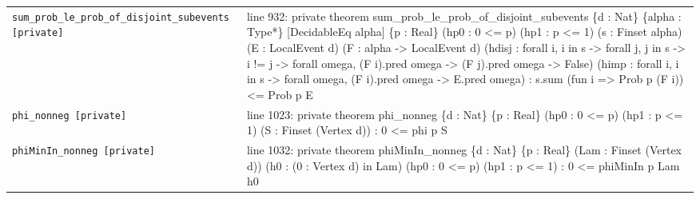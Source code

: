 \documentclass[10pt]{article}
\begin{document}
\begin{longtable}{>{\raggedright\arraybackslash}p{} >{\raggedright\arraybackslash}p{}}
\texttt{sum\_\allowbreak{}prob\_\allowbreak{}le\_\allowbreak{}prob\_\allowbreak{}of\_\allowbreak{}disjoint\_\allowbreak{}subevents [private]} & {\ttfamily\scriptsize line 932:\allowbreak{} private theorem sum\_\allowbreak{}prob\_\allowbreak{}le\_\allowbreak{}prob\_\allowbreak{}of\_\allowbreak{}disjoint\_\allowbreak{}subevents \{d :\allowbreak{} Nat\} \{alpha :\allowbreak{} Type*\allowbreak{}\} [DecidableEq alpha] \{p :\allowbreak{} Real\} (\allowbreak{}hp0 :\allowbreak{} 0 <=\allowbreak{} p)\allowbreak{} (\allowbreak{}hp1 :\allowbreak{} p <=\allowbreak{} 1)\allowbreak{} (\allowbreak{}s :\allowbreak{} Finset alpha)\allowbreak{} (\allowbreak{}E :\allowbreak{} LocalEvent d)\allowbreak{} (\allowbreak{}F :\allowbreak{} alpha -\allowbreak{}> LocalEvent d)\allowbreak{} (\allowbreak{}hdisj :\allowbreak{} forall i,\allowbreak{} i in s -\allowbreak{}> forall j,\allowbreak{} j in s -\allowbreak{}> i !=\allowbreak{} j -\allowbreak{}> forall omega,\allowbreak{} (\allowbreak{}F i)\allowbreak{}.\allowbreak{}pred omega -\allowbreak{}> (\allowbreak{}F j)\allowbreak{}.\allowbreak{}pred omega -\allowbreak{}> False)\allowbreak{} (\allowbreak{}himp :\allowbreak{} forall i,\allowbreak{} i in s -\allowbreak{}> forall omega,\allowbreak{} (\allowbreak{}F i)\allowbreak{}.\allowbreak{}pred omega -\allowbreak{}> E.\allowbreak{}pred omega)\allowbreak{} :\allowbreak{} s.\allowbreak{}sum (\allowbreak{}fun i =\allowbreak{}> Prob p (\allowbreak{}F i)\allowbreak{})\allowbreak{} <=\allowbreak{} Prob p E} \\[0.45em]
\texttt{phi\_\allowbreak{}nonneg [private]} & {\ttfamily\scriptsize line 1023:\allowbreak{} private theorem phi\_\allowbreak{}nonneg \{d :\allowbreak{} Nat\} \{p :\allowbreak{} Real\} (\allowbreak{}hp0 :\allowbreak{} 0 <=\allowbreak{} p)\allowbreak{} (\allowbreak{}hp1 :\allowbreak{} p <=\allowbreak{} 1)\allowbreak{} (\allowbreak{}S :\allowbreak{} Finset (\allowbreak{}Vertex d)\allowbreak{})\allowbreak{} :\allowbreak{} 0 <=\allowbreak{} phi p S} \\[0.45em]
\texttt{phiMinIn\_\allowbreak{}nonneg [private]} & {\ttfamily\scriptsize line 1032:\allowbreak{} private theorem phiMinIn\_\allowbreak{}nonneg \{d :\allowbreak{} Nat\} \{p :\allowbreak{} Real\} (\allowbreak{}Lam :\allowbreak{} Finset (\allowbreak{}Vertex d)\allowbreak{})\allowbreak{} (\allowbreak{}h0 :\allowbreak{} (\allowbreak{}0 :\allowbreak{} Vertex d)\allowbreak{} in Lam)\allowbreak{} (\allowbreak{}hp0 :\allowbreak{} 0 <=\allowbreak{} p)\allowbreak{} (\allowbreak{}hp1 :\allowbreak{} p <=\allowbreak{} 1)\allowbreak{} :\allowbreak{} 0 <=\allowbreak{} phiMinIn p Lam h0} \\[0.45em]

\end{longtable}
\end{document}
